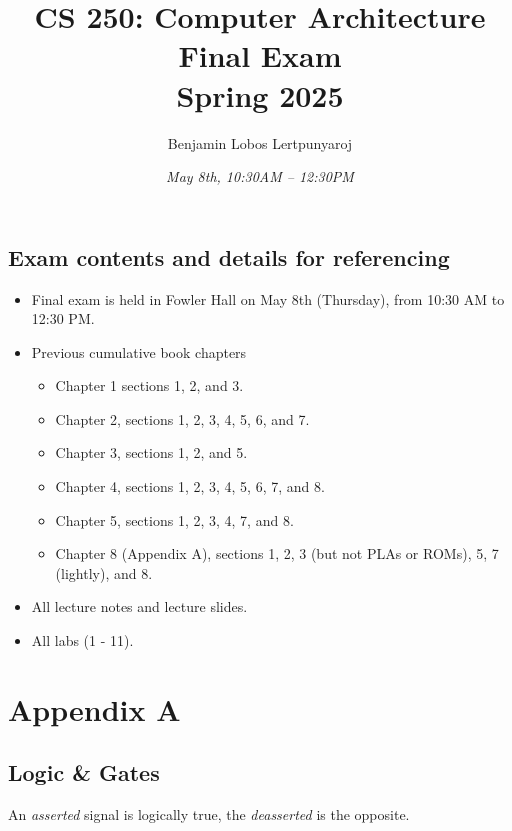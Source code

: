 \documentclass[11pt]{article}
\title{\textbf{CS 250: Computer Architecture\\Final Exam\\Spring 2025}}
\author{Benjamin Lobos Lertpunyaroj}
\date{\textit{May 8th, 10:30{\tiny AM} – 12:30{\tiny PM}}}
\begin{document}
\maketitle

\vspace{1em}

\begin{center}
\section*{Exam contents and details for referencing}
\end{center}

\begin{itemize}[itemsep=-0.5em, left=0pt, label={•}]
    \item Final exam is held in Fowler Hall on May 8th (Thursday), from 10:30 {\tiny AM} to 12:30 {\tiny PM}.
    \item Previous cumulative book chapters
    \vspace{-0.8em}
    \begin{itemize}[itemsep=-0.5em, left=0pt, label={•}]
    \item Chapter 1 sections 1, 2, and 3.
    \item Chapter 2, sections 1, 2, 3, 4, 5, 6, and 7.
    \item Chapter 3, sections 1, 2, and 5.
    \item Chapter 4, sections 1, 2, 3, 4, 5, 6, 7, and 8.
    \item Chapter 5, sections 1, 2, 3, 4, 7, and 8.
    \item Chapter 8 (Appendix A), sections 1, 2, 3 (but not PLAs or ROMs), 5, 7 (lightly), and 8.
    \end{itemize}
    \item All lecture notes and lecture slides.
    \item All labs (1 - 11).
\end{itemize}

\pagebreak

\section*{Appendix A}

\subsection*{Logic \& Gates}
An \textit{asserted} signal is logically true, the \textit{deasserted} is the opposite.
\end{document}
